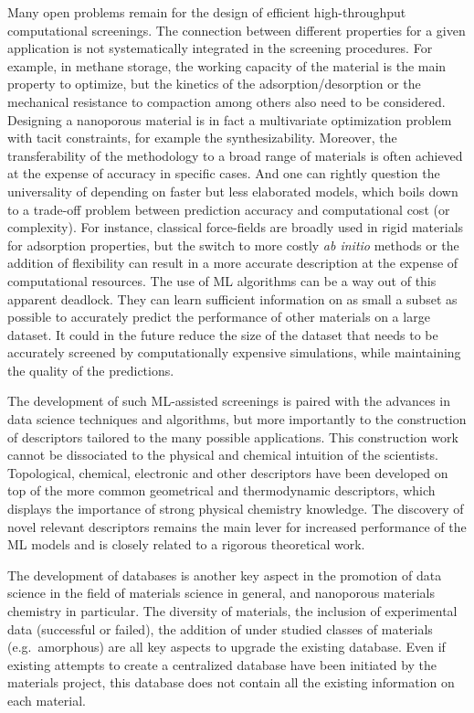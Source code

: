\documentclass[main.tex]{subfiles}
\begin{document}
Many open problems remain for the design of efficient high-throughput computational screenings. The connection between different properties for a given application is not systematically integrated in the screening procedures. For example, in methane storage, the working capacity of the material is the main property to optimize, but the kinetics of the adsorption/desorption or the mechanical resistance to compaction among others also need to be considered. Designing a nanoporous material is in fact a multivariate optimization problem with tacit constraints, for example the {synthesizability}. Moreover, the transferability of the methodology to a broad range of materials is often achieved at the expense of accuracy in specific cases. And one can rightly question the universality of depending on faster but less elaborated models, which boils down to a trade-off problem between prediction accuracy and computational cost (or complexity). For instance, classical force-fields are broadly used in rigid materials for adsorption properties, but the switch to more costly \emph{ab initio} methods or the addition of flexibility can result in a more accurate description at the expense of computational resources. The use of ML algorithms can be a way out of this apparent deadlock. They can learn sufficient information on as small a subset as possible to accurately predict the performance of other materials on a large dataset. It could in the future reduce the size of the dataset that needs to be accurately screened by computationally expensive simulations, while maintaining the quality of the predictions.

The development of such ML-assisted screenings is paired with the advances in data science techniques and algorithms, but more importantly to the construction of descriptors tailored to the many possible applications. This construction work cannot be dissociated to the physical and chemical intuition of the scientists. Topological, chemical, electronic and other descriptors have been developed on top of the more common geometrical and thermodynamic descriptors, which displays the importance of strong physical chemistry knowledge. The discovery of novel relevant descriptors remains the main lever for increased performance of the ML models and is closely related to a rigorous theoretical work.


The development of databases is another key aspect in the promotion of data science in the field of materials science in general, and nanoporous materials chemistry in particular. The diversity of materials, the inclusion of experimental data (successful or failed), the addition of under studied classes of materials (e.g.\ amorphous) are all key aspects to upgrade the existing database. Even if existing attempts to create a centralized database have been initiated by the materials project,\cite{MaterialsProject} this database does not contain all the existing information on each material.
\end{document}
